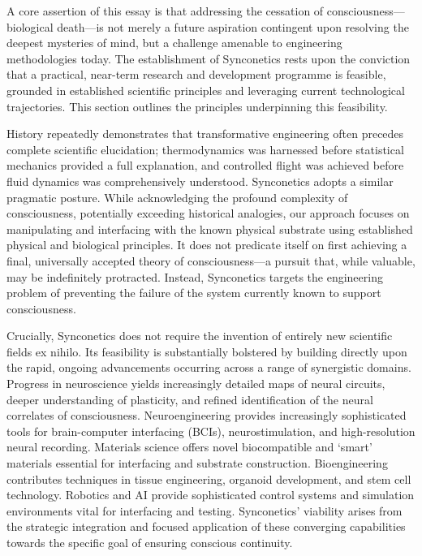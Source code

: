 \documentclass[10pt]{article}
\begin{document}
\begin{sloppypar}
  A core assertion of this essay is that addressing the cessation of consciousness—biological death—is not merely a future aspiration contingent upon resolving the deepest mysteries of mind, but a challenge amenable to engineering methodologies today. The establishment of Synconetics rests upon the conviction that a practical, near-term research and development programme is feasible, grounded in established scientific principles and leveraging current technological trajectories. This section outlines the principles underpinning this feasibility.

  History repeatedly demonstrates that transformative engineering often precedes complete scientific elucidation; thermodynamics was harnessed before statistical mechanics provided a full explanation, and controlled flight was achieved before fluid dynamics was comprehensively understood. Synconetics adopts a similar pragmatic posture. While acknowledging the profound complexity of consciousness, potentially exceeding historical analogies, our approach focuses on manipulating and interfacing with the known physical substrate using established physical and biological principles. It does not predicate itself on first achieving a final, universally accepted theory of consciousness—a pursuit that, while valuable, may be indefinitely protracted. Instead, Synconetics targets the engineering problem of preventing the failure of the system currently known to support consciousness.

  Crucially, Synconetics does not require the invention of entirely new scientific fields ex nihilo. Its feasibility is substantially bolstered by building directly upon the rapid, ongoing advancements occurring across a range of synergistic domains. Progress in neuroscience yields increasingly detailed maps of neural circuits, deeper understanding of plasticity, and refined identification of the neural correlates of consciousness. Neuroengineering provides increasingly sophisticated tools for brain-computer interfacing (BCIs), neurostimulation, and high-resolution neural recording. Materials science offers novel biocompatible and ‘smart’ materials essential for interfacing and substrate construction. Bioengineering contributes techniques in tissue engineering, organoid development, and stem cell technology. Robotics and AI provide sophisticated control systems and simulation environments vital for interfacing and testing. Synconetics’ viability arises from the strategic integration and focused application of these converging capabilities towards the specific goal of ensuring conscious continuity.


\end{sloppypar}
\end{document}
